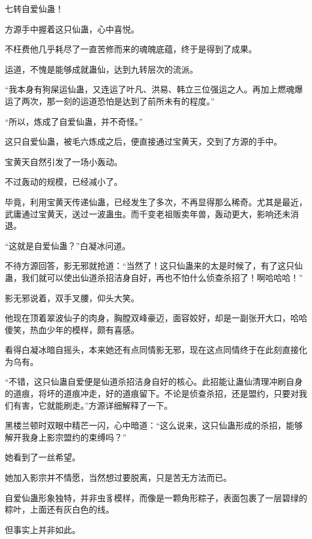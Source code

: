 
\begin{this_body}



七转自爱仙蛊！

方源手中握着这只仙蛊，心中喜悦。

不枉费他几乎耗尽了一直苦修而来的魂魄底蕴，终于是得到了成果。

运道，不愧是能够成就蛊仙，达到九转层次的流派。

“我本身有狗屎运仙蛊，又连运了叶凡、洪易、韩立三位强运之人。再加上燃魂爆运了两次，那一刻的运道恐怕是达到了前所未有的程度。”

“所以，炼成了自爱仙蛊，并不奇怪。”

这只自爱仙蛊，被毛六炼成之后，便直接通过宝黄天，交到了方源的手中。

宝黄天自然引发了一场小轰动。

不过轰动的规模，已经减小了。

毕竟，利用宝黄天传递仙蛊，已经发生了多次，不再显得那么稀奇。尤其是最近，武庸通过宝黄天，送过一波蛊虫。而千变老祖贩卖年兽，轰动更大，影响还未消退。

“这就是自爱仙蛊？”白凝冰问道。

不待方源回答，影无邪就抢道：“当然了！这只仙蛊来的太是时候了，有了这只仙蛊，我们就可以使出仙道杀招洁身自好，再也不怕什么侦查杀招了！啊哈哈哈！”

影无邪说着，双手叉腰，仰头大笑。

他现在顶着翠波仙子的肉身，胸膛双峰豪迈，面容姣好，却是一副张开大口，哈哈傻笑，热血少年的模样，颇有喜感。

看得白凝冰暗自摇头，本来她还有点同情影无邪，现在这点同情终于在此刻直接化为乌有。

“不错，这只仙蛊自爱便是仙道杀招洁身自好的核心。此招能让蛊仙清理冲刷自身的道痕，将坏的道痕冲走，好的道痕留下。不论是侦查杀招，还是盟约，只要对我们有害，它就能刷走。”方源详细解释了一下。

黑楼兰顿时双眼中精芒一闪，心中暗道：“这么说来，这只仙蛊形成的杀招，能够解开我身上影宗盟约的束缚吗？”

她看到了一丝希望。

她加入影宗并不情愿，当然想过要脱离，只是苦无方法而已。

自爱仙蛊形象独特，并非虫豸模样，而像是一颗角形粽子，表面包裹了一层碧绿的粽叶，上面还有灰白色的线。

但事实上并非如此。


\end{this_body}
